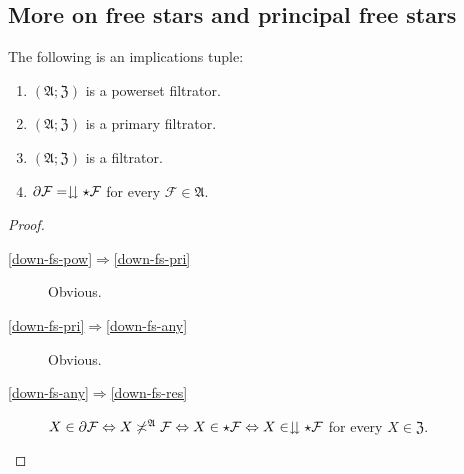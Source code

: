 \subsection{More on free stars and principal free stars}
\begin{prop}
The following is an implications tuple:
\begin{enumerate}
\item\label{down-fs-pow} $(\mathfrak{A};\mathfrak{Z})$ is a powerset filtrator.
\item\label{down-fs-pri} $(\mathfrak{A};\mathfrak{Z})$ is a primary filtrator.
\item\label{down-fs-any} $(\mathfrak{A};\mathfrak{Z})$ is a filtrator.
\item\label{down-fs-res} $\partial\mathcal{F}=\downdownarrows\star\mathcal{F}$ for every
  $\mathcal{F}\in\mathfrak{A}$.
\end{enumerate}
\end{prop}

\begin{proof}
~
\begin{description}
\item [\ref{down-fs-pow}$\Rightarrow$\ref{down-fs-pri}] Obvious.
\item [\ref{down-fs-pri}$\Rightarrow$\ref{down-fs-any}] Obvious.
\item [\ref{down-fs-any}$\Rightarrow$\ref{down-fs-res}]
$X\in\partial\mathcal{F} \Leftrightarrow
X\not\asymp^{\mathfrak{A}}\mathcal{F} \Leftrightarrow
X\in\star\mathcal{F}\Leftrightarrow
X\in\downdownarrows\star\mathcal{F}$ for every $X\in\mathfrak{Z}$.
\end{description}
\end{proof}

